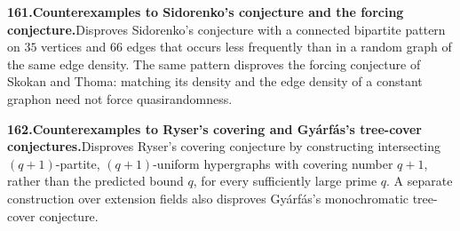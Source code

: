 \documentclass[11pt,a4paper]{article}
\begin{document}
  \par \begin{minipage}{\linewidth}
  \fontsize{10.5}{12.6}\selectfont\RaggedRight
  \hypertarget{result 161}{}
  {\bfseries\textcolor{muted}{161.}\enspace Counterexamples to Sidorenko's conjecture and the forcing conjecture.}\enspace Disproves Sidorenko's conjecture with a connected bipartite pattern on $35$ vertices and $66$ edges that occurs less frequently than in a random graph of the same edge density. The same pattern disproves the forcing conjecture of Skokan and Thoma: matching its density and the edge density of a constant graphon need not force quasirandomness.\par
  \end{minipage}\par\vspace{5pt}



  \par \begin{minipage}{\linewidth}
  \fontsize{10.5}{12.6}\selectfont\RaggedRight
  \hypertarget{result 162}{}
  {\bfseries\textcolor{muted}{162.}\enspace Counterexamples to Ryser's covering and Gy\'arf\'as's tree-cover conjectures.}\enspace Disproves Ryser's covering conjecture by constructing intersecting $(q+1)$-partite, $(q+1)$-uniform hypergraphs with covering number $q+1$, rather than the predicted bound $q$, for every sufficiently large prime $q$. A separate construction over extension fields also disproves Gy\'arf\'as's monochromatic tree-cover conjecture.\par
  \end{minipage}\par\vspace{5pt}
\end{document}
